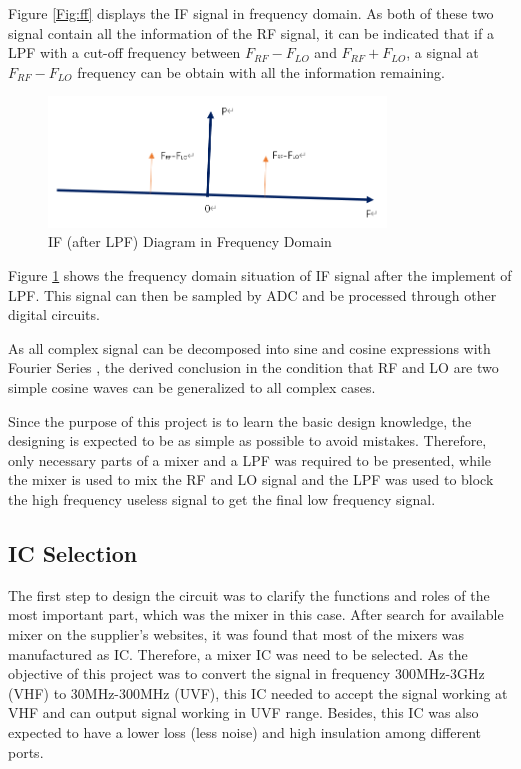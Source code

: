\documentclass[12pt, a4paper]{report}
\begin{document}
Figure \ref{Fig:ff} displays the IF signal in frequency domain. As both of these two signal contain all the information of the RF signal, it can be indicated that if a LPF with a cut-off frequency between $F_{RF}-F_{LO}$ and $F_{RF}+F_{LO}$, a signal at $F_{RF}-F_{LO}$ frequency can be obtain with all the information remaining.

\newpage

\begin{figure}[htbp]     \begin{centering}
    \includegraphics[width=0.8\textwidth]{img/fff.png}
    \caption{\label{Fig:fff}IF (after LPF) Diagram in Frequency Domain}
    \end{centering}
\end{figure}

Figure \ref{Fig:fff} shows the frequency domain situation of IF signal after the implement of LPF. This signal can then be sampled by ADC and be processed through other digital circuits.

As all complex signal can be decomposed into sine and cosine expressions with Fourier Series \cite{book}, the derived conclusion in the condition that RF and LO are two simple cosine waves can be generalized to all complex cases. 

Since the purpose of this project is to learn the basic design knowledge, the designing is expected to be as simple as possible to avoid mistakes. Therefore, only necessary parts of a mixer and a LPF was required to be presented, while the mixer is used to mix the RF and LO signal and the LPF was used to block the high frequency useless signal to get the final low frequency signal.

\subsection{IC Selection}

The first step to design the circuit was to clarify the functions and roles of the most important part, which was the mixer in this case. After search for available mixer on the supplier's websites, it was found that most of the mixers was manufactured as IC. Therefore, a mixer IC was need to be selected. As the objective of this project was to convert the signal in frequency 300MHz-3GHz (VHF) to 30MHz-300MHz (UVF), this IC needed to accept the signal working at VHF and can output signal working in UVF range. Besides, this IC was also expected to have a lower loss (less noise) and high insulation among different ports.
\end{document}
